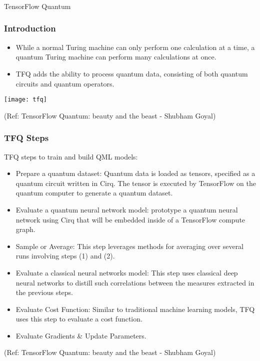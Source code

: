 \begin{frame}[fragile]\frametitle{}
\begin{center}
{\Large TensorFlow Quantum}
\end{center}
\end{frame}

 \begin{frame}[fragile]\frametitle{Introduction}
 
\begin{itemize}
\item  While a normal Turing machine can only perform one calculation at a time, a quantum Turing machine can perform many calculations at once.
\item  TFQ adds the ability to process quantum data, consisting of both quantum circuits and quantum operators. 
\end{itemize}

\begin{center}
\texttt{[image: tfq]}
\end{center}
	
	
\tiny{(Ref: TensorFlow Quantum: beauty and the beast  - Shubham Goyal)}

\end{frame}

 \begin{frame}[fragile]\frametitle{TFQ Steps}
 
 TFQ steps to train and build QML models:
 
\begin{itemize}
\item  Prepare a quantum dataset: Quantum data is loaded as tensors, specified as a quantum circuit written in Cirq. The tensor is executed by TensorFlow on the quantum computer to generate a quantum dataset.
\item  Evaluate a quantum neural network model: prototype a quantum neural network using Cirq that will be embedded inside of a TensorFlow compute graph.
\item  Sample or Average: This step leverages methods for averaging over several runs involving steps (1) and (2).
\item  Evaluate a classical neural networks model: This step uses classical deep neural networks to distill such correlations between the measures extracted in the previous steps.
\item  Evaluate Cost Function: Similar to traditional machine learning models, TFQ uses this step to evaluate a cost function.
\item  Evaluate Gradients \& Update Parameters.
\end{itemize}

	
\tiny{(Ref: TensorFlow Quantum: beauty and the beast  - Shubham Goyal)}

\end{frame}


